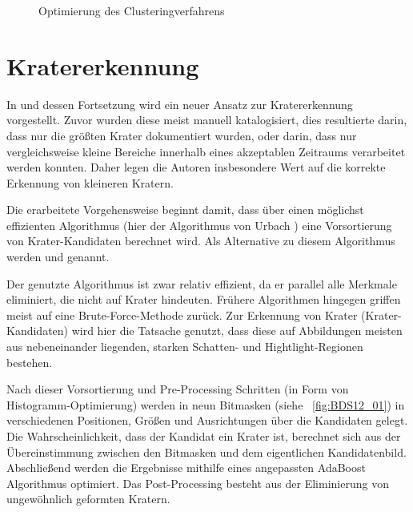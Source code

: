 \begin{figure}[h!]
\begin{subfigure}[t]{0.32\textwidth}
	\end{subfigure}
	\hfill
	\begin{subfigure}[t]{0.32\textwidth}
		\hfill
	\end{subfigure}
	\caption{Optimierung des Clusteringverfahrens}
	\label{fig:tsugf_optim}
\end{figure}

\section{Kratererkennung}
\label{sec:craterdetection}

In \cite{bandeira_10} und dessen Fortsetzung \cite{bandeira_12} wird ein neuer Ansatz zur Kratererkennung vorgestellt. Zuvor wurden diese meist manuell katalogisiert, dies resultierte darin, dass nur die größten Krater dokumentiert wurden, oder darin, dass nur vergleichsweise kleine Bereiche innerhalb eines akzeptablen Zeitraums verarbeitet werden konnten. Daher legen die Autoren insbesondere Wert auf die korrekte Erkennung von kleineren Kratern.

Die erarbeitete Vorgehensweise beginnt damit, dass über einen möglichst effizienten Algorithmus (hier der Algorithmus von Urbach \etal \cite{urbach_stepinski_2009}) eine Vorsortierung von Krater-Kandidaten berechnet wird. Als Alternative zu diesem Algorithmus werden \cite{bandeira_07} und \cite{salamuniccar_10} genannt.

Der genutzte Algorithmus ist zwar relativ effizient, da er parallel alle Merkmale eliminiert, die nicht auf Krater hindeuten. Frühere Algorithmen hingegen griffen meist auf eine Brute-Force-Methode zurück. Zur Erkennung von Krater (\bzw Krater-Kandidaten) wird hier die Tatsache genutzt, dass diese auf Abbildungen meisten aus nebeneinander liegenden, starken Schatten- und Hightlight-Regionen bestehen.

Nach dieser Vorsortierung und Pre-Processing Schritten (in Form von Histogramm-Optimierung) werden in \cite{bandeira_10, bandeira_12} neun Bitmasken (siehe \figurename~\ref{fig:BDS12_01}) in verschiedenen Positionen, Größen und Ausrichtungen über die Kandidaten gelegt. Die Wahrscheinlichkeit, dass der Kandidat ein Krater ist, berechnet sich aus der Übereinstimmung zwischen den Bitmasken und dem eigentlichen Kandidatenbild. Abschließend werden die Ergebnisse mithilfe eines angepassten AdaBoost Algorithmus optimiert. Das Post-Processing besteht aus der Eliminierung von ungewöhnlich geformten Kratern.

